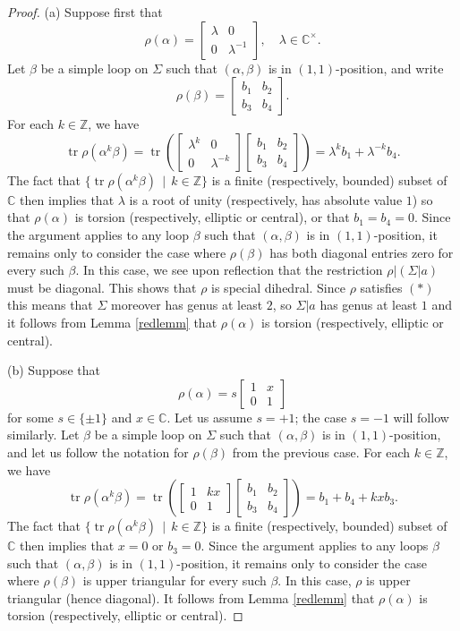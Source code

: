 \documentclass[reqno]{amsart}
\theoremstyle{plain}
\theoremstyle{definition}
\theoremstyle{remark}
\newcommand{\C}{{\mathbb{C}}}
\newcommand{\Z}{{\mathbb{Z}}}
\DeclareMathOperator{\tr}{tr}
\begin{document}
\begin{proof}
(a) Suppose first that
	$$\rho(\alpha)=\begin{bmatrix}\lambda & 0 \\ 0 &\lambda^{-1}\end{bmatrix},\quad \lambda\in\C^\times.$$
	Let $\beta$ be a simple loop on $\Sigma$ such that $(\alpha,\beta)$ is in $(1,1)$-position, and write
$$\rho(\beta)=\begin{bmatrix} b_1 & b_2\\ b_3 & b_4\end{bmatrix}.$$
	For each $k\in\Z$, we have
	$$\tr\rho(\alpha^k\beta)=\tr\left(\begin{bmatrix}\lambda^k &0 \\ 0 & \lambda^{-k}\end{bmatrix}\begin{bmatrix} b_1 & b_2\\ b_3 & b_4\end{bmatrix}\right)=\lambda^kb_1+\lambda^{-k}b_4.$$
	The fact that $\{\tr\rho(\alpha^k\beta)\,\mid\,k\in\Z\}$ is a finite (respectively, bounded) subset of $\C$ then implies that $\lambda$ is a root of unity (respectively, has absolute value $1$) so that $\rho(\alpha)$ is torsion (respectively, elliptic or central), or that $b_1=b_4=0$. Since the argument applies to any loop $\beta$ such that $(\alpha,\beta)$ is in $(1,1)$-position, it remains only to consider the case where $\rho(\beta)$ has both diagonal entries zero for every such $\beta$. In this case, we see upon reflection that
the restriction $\rho|(\Sigma|a)$ must be diagonal. This shows that $\rho$ is special dihedral. Since $\rho$ satisfies $(*)$ this means that $\Sigma$ moreover has genus at least $2$, so $\Sigma|a$ has genus at least $1$ and it follows from Lemma \ref{redlemm} that $\rho(\alpha)$ is torsion (respectively, elliptic or central).

(b) Suppose that
	$$\rho(\alpha)=s\begin{bmatrix}1 & x \\ 0 &1\end{bmatrix}$$
	for some $s\in\{\pm1\}$ and $x\in\C$. Let us assume $s=+1$; the case $s=-1$ will follow similarly. Let $\beta$ be a simple loop on $\Sigma$ such that $(\alpha,\beta)$ is in $(1,1)$-position, and let us follow the notation for $\rho(\beta)$ from the previous case. For each $k\in\Z$, we have
	$$\tr\rho(\alpha^k\beta)=\tr\left(\begin{bmatrix}1 &kx \\ 0 & 1\end{bmatrix}\begin{bmatrix} b_1 & b_2\\ b_3 & b_4\end{bmatrix}\right)=b_1+b_4+kxb_3.$$
 The fact that $\{\tr\rho(\alpha^k\beta)\,\mid\,k\in\Z\}$ is a finite (respectively, bounded) subset of $\C$ then implies that $x=0$ or $b_3=0$. Since the argument applies to any loops $\beta$ such that $(\alpha,\beta)$ is in $(1,1)$-position, it remains only to consider the case where $\rho(\beta)$ is upper triangular for every such $\beta$. In this case, $\rho$ is upper triangular (hence diagonal). It follows from Lemma \ref{redlemm} that $\rho(\alpha)$ is torsion (respectively, elliptic or central).


\end{proof}
\end{document}
